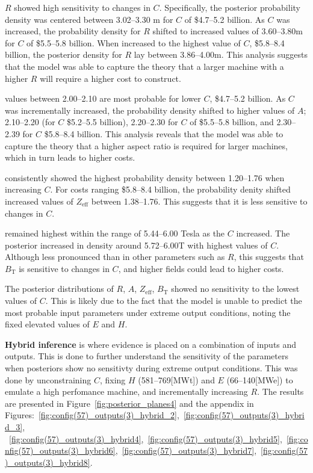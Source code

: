 \documentclass[journal]{IEEEtran}
\begin{document}
\textbf{$R$} showed high sensitivity to changes in $C$. Specifically, the posterior probability density was centered between 3.02--3.30 m for $C$ of \$4.7--5.2 billion. As $C$ was increased, the probability density for $R$ shifted to increased values of 3.60--3.80m for $C$ of \$5.5--5.8 billion. When increased to the highest value of $C$, \$5.8--8.4 billion, the posterior density for $R$ lay between 3.86--4.00m. This analysis suggests that the model was able to capture the theory that a larger machine with a higher $R$ will require a higher cost to construct. 

 values between 2.00--2.10 are most probable for lower $C$, \$4.7--5.2 billion. As $C$ was incrementally increased, the probability density shifted to higher values of $A$; 2.10--2.20 (for $C$ \$5.2--5.5 billion), 2.20--2.30 for $C$ of \$5.5--5.8 billion, and 2.30--2.39 for $C$ \$5.8--8.4 billion. This analysis reveals that the model was able to capture the theory that a higher aspect ratio is required for larger machines, which in turn leads to higher costs. 

 consistently showed the highest probability density between 1.20--1.76 when increasing $C$. For costs ranging \$5.8--8.4 billion, the probability denity shifted increased values of $Z_{\text{eff}}$ between 1.38--1.76. This suggests that it is less sensitive to changes in $C$.

 remained highest within the range of 5.44--6.00 Tesla as the $C$ increased. The posterior increased in density around 5.72--6.00T with highest values of $C$. Although less pronounced than in other parameters such as $R$, this suggests that $B_{\text{T}}$ is sensitive to changes in $C$, and higher fields could lead to higher costs. 

The posterior distributions of $R$, $A$, $Z_{\text{eff}}$, $B_{\text{T}}$ showed no sensitivity to the lowest values of $C$. This is likely due to the fact that the model is unable to predict the most probable input parameters under extreme output conditions, noting the fixed elevated values of $E$ and $H$. 

\textbf{Hybrid inference} is where evidence is placed on a combination of inputs and outputs. This is done to further understand the sensitivity of the  parameters when posteriors show no sensitivty during extreme output conditions. This was done by unconstraining $C$, fixing $H$ (581--769[MWt]) and $E$ (66--140[MWe]) to emulate a high perfomance machine, and incrementally increasing $R$. The results are presented in Figure~\ref{fig:posterior_planes4} and the appendix in Figures:~\ref{fig:config(57)_outputs(3)_hybrid_2},~\ref{fig:config(57)_outputs(3)_hybrid_3},
~\ref{fig:config(57)_outputs(3)_hybrid4},~\ref{fig:config(57)_outputs(3)_hybrid5},~\ref{fig:config(57)_outputs(3)_hybrid6},~\ref{fig:config(57)_outputs(3)_hybrid7},~\ref{fig:config(57)_outputs(3)_hybrid8}.
\end{document}
